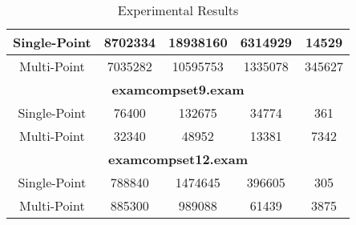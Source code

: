 \begin{table}[H]
{\begin{tabular}{|c|c|c|c|c|}
Single-Point      & 8702334                  & 18938160                 & 6314929                 & 14529                 \\ \hline
Multi-Point       & 7035282                  & 10595753                 & 1335078                 & 345627                \\ \hline
\multicolumn{5}{|c|}{\textbf{examcompset9.exam}}                                                                          \\ \hline
Single-Point      & 76400                    & 132675                   & 34774                   & 361                   \\ \hline
Multi-Point       & 32340                    & 48952                    & 13381                   & 7342                  \\ \hline
\multicolumn{5}{|c|}{\textbf{examcompset12.exam}}                                                                         \\ \hline
Single-Point      & 788840                   & 1474645                  & 396605                  & 305                   \\ \hline
Multi-Point       & 885300                   & 989088                   & 61439                   & 3875                  \\ \hline
\end{tabular}}
\caption{Experimental Results}
\label{tab:results}
\end{table}
